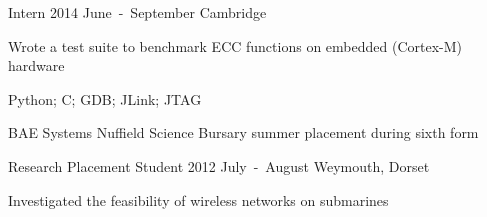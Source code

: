 \begin{cventries}
\cventryrole
  {Intern}
  {2014 June~-~September}
  {Cambridge}
  {\begin{cvitems}
    \item {Wrote a test suite to benchmark ECC functions on embedded (Cortex-M) hardware}
    \item {Python; C; GDB; JLink; JTAG}
  \end{cvitems}}

\cventryjob
  {BAE Systems}
  {Nuffield Science Bursary summer placement during sixth form}

\cventryrole
  {Research Placement Student}
  {2012 July~-~August}
  {Weymouth, Dorset}
  {\begin{cvitems}
    \item {Investigated the feasibility of wireless networks on submarines}
  \end{cvitems}}

\end{cventries}
